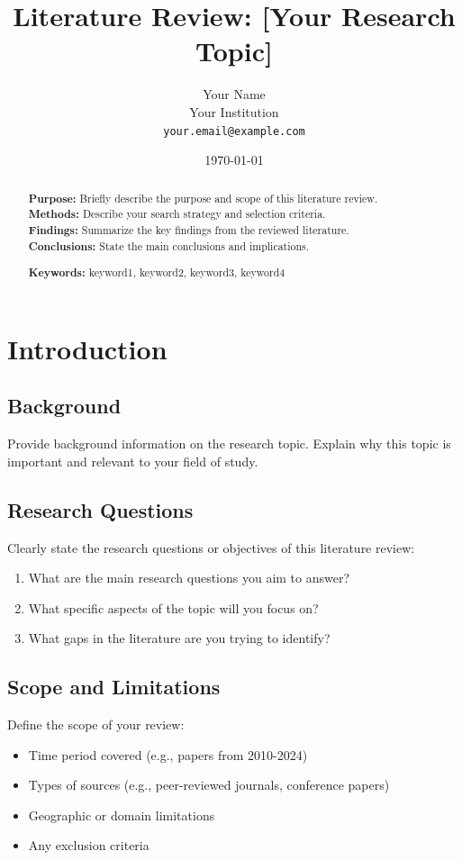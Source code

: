 \documentclass[11pt,a4paper]{article}
\title{\textbf{Literature Review: [Your Research Topic]}}
\author{Your Name \\
        Your Institution \\
        \texttt{your.email@example.com}}
\date{\today}
\begin{document}
\maketitle

\begin{abstract}
\noindent
\textbf{Purpose:} Briefly describe the purpose and scope of this literature review. \\
\textbf{Methods:} Describe your search strategy and selection criteria. \\
\textbf{Findings:} Summarize the key findings from the reviewed literature. \\
\textbf{Conclusions:} State the main conclusions and implications.

\vspace{0.5em}
\noindent\textbf{Keywords:} keyword1, keyword2, keyword3, keyword4
\end{abstract}

\tableofcontents
\newpage

\section{Introduction}
\label{sec:intro}

\subsection{Background}
Provide background information on the research topic. Explain why this topic is important and relevant to your field of study.

\subsection{Research Questions}
Clearly state the research questions or objectives of this literature review:
\begin{enumerate}
    \item What are the main research questions you aim to answer?
    \item What specific aspects of the topic will you focus on?
    \item What gaps in the literature are you trying to identify?
\end{enumerate}

\subsection{Scope and Limitations}
Define the scope of your review:
\begin{itemize}
    \item Time period covered (e.g., papers from 2010-2024)
    \item Types of sources (e.g., peer-reviewed journals, conference papers)
    \item Geographic or domain limitations
    \item Any exclusion criteria
\end{itemize}
\end{document}
